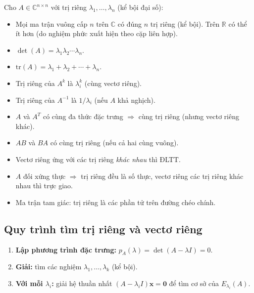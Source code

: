 \documentclass[12pt,a4paper]{article}
\begin{document}
\begin{tinhchat}[title={Tính chất trị riêng}]
Cho $A \in \mathbb{C}^{n\times n}$ với trị riêng $\lambda_1, \ldots, \lambda_n$ (kể bội đại số):
\begin{itemize}
  \item Mọi ma trận vuông cấp $n$ trên $\mathbb{C}$ có đúng $n$ trị riêng (kể bội). Trên $\mathbb{R}$ có thể ít hơn (do nghiệm phức xuất hiện theo cặp liên hợp).
  \item $\det(A) = \lambda_1 \lambda_2 \cdots \lambda_n$.
  \item $\mathrm{tr}(A) = \lambda_1 + \lambda_2 + \cdots + \lambda_n$.
  \item Trị riêng của $A^k$ là $\lambda_i^k$ (cùng vectơ riêng).
  \item Trị riêng của $A^{-1}$ là $1/\lambda_i$ (nếu $A$ khả nghịch).
  \item $A$ và $A^T$ có cùng đa thức đặc trưng $\Rightarrow$ cùng trị riêng (nhưng vectơ riêng khác).
  \item $AB$ và $BA$ có cùng trị riêng (nếu cả hai cùng vuông).
  \item Vectơ riêng ứng với các trị riêng \emph{khác nhau} thì ĐLTT.
  \item $A$ đối xứng thực $\Rightarrow$ trị riêng đều là số thực, vectơ riêng các trị riêng khác nhau thì trực giao.
  \item Ma trận tam giác: trị riêng là các phần tử trên đường chéo chính.
\end{itemize}
\end{tinhchat}

\subsection{Quy trình tìm trị riêng và vectơ riêng}

\begin{phuongphap}
\begin{enumerate}
  \item \textbf{Lập phương trình đặc trưng:} $p_A(\lambda) = \det(A - \lambda I) = 0$.
  \item \textbf{Giải:} tìm các nghiệm $\lambda_1, \ldots, \lambda_k$ (kể bội).
  \item \textbf{Với mỗi $\lambda_i$:} giải hệ thuần nhất $(A - \lambda_i I)\mathbf{x} = \mathbf{0}$ để tìm cơ sở của $E_{\lambda_i}(A)$.
\end{enumerate}
\end{phuongphap}
\end{document}
